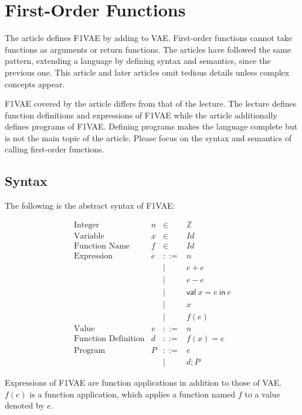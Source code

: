 \setchapterpreamble[u]{\margintoc}
\chapter{First-Order Functions}

The article defines F1VAE by adding  to VAE.
First-order functions cannot take functions as arguments or return functions. The
articles have followed the same pattern, extending a language by defining syntax
and semantics, since the previous one. This article and later articles omit
tedious details unless complex concepts appear.

F1VAE covered by the article differs from that of the lecture. The lecture
defines function definitions and expressions of F1VAE while the article
additionally defines programs of F1VAE. Defining programs makes the language
complete but is not the main topic of the article. Please focus on the syntax and
semantics of calling first-order functions.

\section{Syntax}

The following is the abstract syntax of F1VAE:

\[
\begin{array}{lrcl}
\text{Integer} & n & \in & \mathbb{Z} \\
\text{Variable} & x & \in & \textit{Id} \\
\text{Function Name} & f & \in & \textit{Id} \\
\text{Expression} & e & ::= & n \\
&& | & e + e \\
&& | & e - e \\
&& | & \textsf{val}\ x = e\ \textsf{in}\ e \\
&& | & x \\
&& | & f(e) \\
\text{Value} & v & ::= & n \\
\text{Function Definition} & d & ::= & f(x)=e \\
\text{Program} & P & ::= & e \\
&& | & d;P
\end{array}
\]

Expressions of F1VAE are function applications in addition to those of VAE.
\(f(e)\) is a function application, which applies a function named \(f\) to a
value denoted by \(e\).

